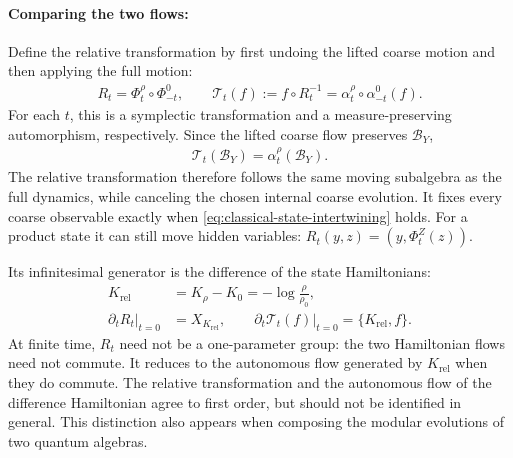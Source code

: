 \documentclass[a4paper,11pt]{article}
\theoremstyle{definition}
\newcommand{\mB}{\mathcal{B}}
\newcommand{\nn}{\nonumber}
\begin{document}
\paragraph{Comparing the two flows:}
Define the relative transformation by first undoing the lifted coarse motion and then applying the full motion:
\begin{align}\label{eq:classical-relative-transformation}
    R_t=\Phi_t^\rho\circ\Phi_{-t}^0,
    \qquad
    \mathcal T_t(f):=f\circ R_t^{-1}
    =\alpha_t^\rho\circ\alpha_{-t}^0(f).
\end{align}
For each $t$, this is a symplectic transformation and a measure-preserving automorphism, respectively. Since the lifted coarse flow preserves $\mB_Y$,
\begin{align}\label{eq:classical-relative-algebra-flow}
    \mathcal T_t(\mB_Y)=\alpha_t^\rho(\mB_Y).
\end{align}
The relative transformation therefore follows the same moving subalgebra as the full dynamics, while canceling the chosen internal coarse evolution. It fixes every coarse observable exactly when \eqref{eq:classical-state-intertwining} holds. For a product state it can still move hidden variables: $R_t(y,z)=(y,\Phi_t^Z(z))$.

Its infinitesimal generator is the difference of the state Hamiltonians:
\begin{align}\label{eq:classical-relative-Hamiltonian}
    K_{\mathrm{rel}}&=K_\rho-K_0=-\log\frac{\rho}{\rho_0},\nn\\
    \left.\partial_tR_t\right|_{t=0}&=X_{K_{\mathrm{rel}}},\qquad
    \left.\partial_t\mathcal T_t(f)\right|_{t=0}=\{K_{\mathrm{rel}},f\}.
\end{align}
At finite time, $R_t$ need not be a one-parameter group: the two Hamiltonian flows need not commute. It reduces to the autonomous flow generated by $K_{\mathrm{rel}}$ when they do commute. The relative transformation and the autonomous flow of the difference Hamiltonian agree to first order, but should not be identified in general. This distinction also appears when composing the modular evolutions of two quantum algebras.
\end{document}
